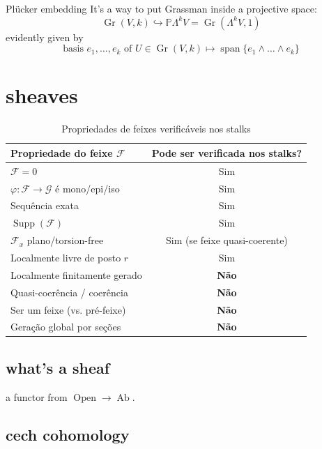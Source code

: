 \begin{thing7}{Plücker embedding}\leavevmode
It's a way to put Grassman inside a projective space:
\[\operatorname{Gr}(V,k) \hookrightarrow \mathbb{P}\Lambda^{k}V = \operatorname{Gr}(\Lambda^{k}V,1)\]
evidently given by
\[\text{basis } e_1,\ldots,e_k\text{ of \(U \in \operatorname{Gr}(V,k)\)}\longmapsto \operatorname{span}\{e_1 \wedge \ldots \wedge e_k\}\]


\end{thing7}




\section{sheaves}
\begin{table}[h!]
\centering
\renewcommand{\arraystretch}{1.3}
\begin{tabular}{|l|c|}
\hline
\textbf{Propriedade do feixe \( \mathcal{F} \)} & \textbf{Pode ser verificada nos stalks?} \\
\hline
\( \mathcal{F} = 0 \) & Sim \\
\( \varphi: \mathcal{F} \to \mathcal{G} \) é mono/epi/iso & Sim \\
Sequência exata & Sim \\
\( \operatorname{Supp}(\mathcal{F}) \) & Sim \\
\( \mathcal{F}_x \) plano/torsion-free & Sim (se feixe quasi-coerente) \\
Localmente livre de posto \( r \) & Sim \\
\hline
Localmente finitamente gerado & \textbf{Não} \\
Quasi-coerência / coerência & \textbf{Não} \\
Ser um feixe (vs. pré-feixe) & \textbf{Não} \\
Geração global por seções & \textbf{Não} \\
\hline
\end{tabular}
\caption{Propriedades de feixes verificáveis nos stalks}
\end{table}

\subsection{what's a sheaf}
a functor from \(\operatorname{Open} \to \operatorname{Ab} \).

\subsection{cech cohomology}


